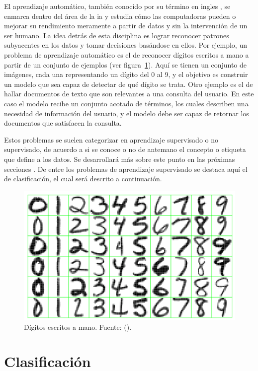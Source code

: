 El aprendizaje automático, también conocido por su término en ingles
, se enmarca dentro del área de la
\acrfull{ia} y estudia cómo las computadoras pueden  o
mejorar su rendimiento meramente a partir de datos y sin la intervención de un
ser humano.  La idea detrás de esta disciplina es lograr reconocer patrones
subyacentes en los datos y tomar decisiones basándose en ellos. Por ejemplo, un
problema de aprendizaje automático es el de reconocer dígitos escritos a mano a
partir de un conjunto de ejemplos (ver figura~\ref{fig:reconocimiento_digitos}).
Aquí se tienen un conjunto de imágenes, cada una representando un dígito del 0
al 9, y el objetivo es construir un modelo que sea capaz de detectar de qué
dígito se trata. Otro ejemplo es el de hallar documentos de texto que son
relevantes a una consulta del usuario. En este caso el modelo recibe un conjunto
acotado de términos, los cuales describen una necesidad de información del
usuario, y el modelo debe ser capaz de retornar los documentos que satisfacen la
consulta.

Estos problemas se suelen categorizar en aprendizaje supervisado o no
supervisado, de acuerdo a si se conoce o no de antemano el concepto o etiqueta
que define a los datos. Se desarrollará más sobre este punto en las próximas
secciones . De
entre los problemas de aprendizaje supervisado se destaca aquí el de
clasificación, el cual será descrito a continuación.

\begin{figure}
	\includegraphics[width=0.66\linewidth]{figures/digits_recognition_v2.png}
	\centering
	\caption{Dígitos escritos a mano. Fuente: 
		(\citeyear{hastie_elements_2009}).}
	\label{fig:reconocimiento_digitos}
\end{figure}

\section{Clasificación}

